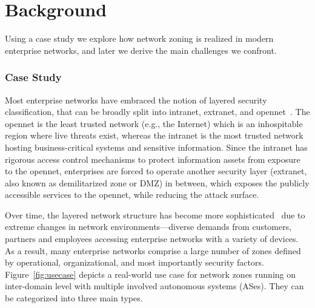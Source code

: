 \chapter{Background}
\label{background}


Using a case study we explore how network zoning is realized in modern enterprise networks, and later we derive the main challenges we confront.

\subsection{Case Study}
\label{ssec:casestudy}

Most enterprise networks have embraced the notion of layered security classification,
that can be broadly split into intranet, extranet, and opennet~\cite{ramasamy2011towards}. 
The opennet is the least trusted network (e.g., the Internet) which is an inhospitable region 
where live threats exist, whereas the intranet is the most trusted network hosting 
business-critical systems and sensitive information. Since the intranet has rigorous access 
control mechanisms to protect information assets from exposure to the opennet, enterprises are 
forced to operate another security layer (extranet, also known as demilitarized zone or DMZ) in between, which exposes the publicly 
accessible services to the opennet, while reducing the attack surface. 

Over time, the layered network structure has become more sophisticated~\cite{obregon2015infrastructure}
due to extreme changes in network environments---diverse demands from customers, partners
and employees accessing enterprise networks with a variety of devices.
As a result, many enterprise networks 
comprise a large number of zones defined by operational, organizational, and most
importantly security factors. Figure~\ref{fig:usecase} depicts a real-world use case for 
network zones running on inter-domain level with multiple involved autonomous systems (ASes). They 
can be categorized into three main types. 

